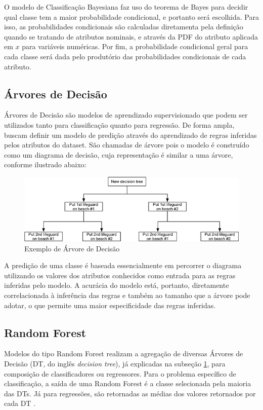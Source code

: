 \documentclass{homework}
\begin{document}
O modelo de Classificação Bayesiana faz uso do teorema de Bayes para decidir qual classe tem a maior probabilidade
condicional, e portanto será escolhida. Para isso, as probabilidades condicionais são calculadas diretamenta pela
definição quando se tratando de atributos nominais, e através da PDF do atributo aplicada em $x$ para variáveis
numéricas. Por fim, a probabilidade condicional geral para cada classe será dada pelo produtório das probabilidades
condicionais de cada atributo.

\subsection{Árvores de Decisão}
\label{dt}

Árvores de Decisão são modelos de aprendizado supervisionado que podem ser utilizados tanto para classificação quanto
para regressão. De forma ampla, buscam definir um modelo de predição através do aprendizado de regras inferidas pelos
atributos do dataset. São chamadas de árvore pois o modelo é construído como um diagrama de decisão, cuja representação
é similar a uma árvore, conforme ilustrado abaixo:

\begin{figure}[h!]
    \centerline{\includegraphics[scale=2]{decision_tree.png}}
    \label{decision_tree}
    \caption{Exemplo de Árvore de Decisão \cite{decision_tree}}
\end{figure}

A predição de uma classe é baseada essencialmente em percorrer o diagrama utilizando os valores dos atributos conhecidos
como entrada para as regras inferidas pelo modelo. A acurácia do modelo está, portanto, diretamente correlacionada à
inferência das regras e também ao tamanho que a árvore pode adotar, o que permite uma maior especificidade das regras
inferidas.

\subsection{Random Forest}

Modelos do tipo Random Forest realizam a agregação de diversas Árvores de Decisão (DT, do inglês \textit{decision tree}),
já explicadas na subseção \ref{decision_tree}, para composição de classificadores ou regressores. Para o problema
específico de classificação, a saída de uma Random Forest é a classe selecionada pela maioria das DTs. Já para
regressões, são retornadas as médias dos valores retornados por cada DT \cite{random_forest}.
\end{document}
